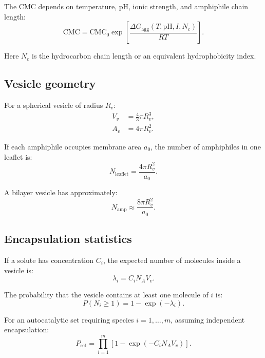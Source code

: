 \documentclass[11pt]{article}
\begin{document}
The CMC depends on temperature, pH, ionic strength, and amphiphile chain
length:
\begin{equation}
    \mathrm{CMC}
    =
    \mathrm{CMC}_0
    \exp\left[
    \frac{\Delta G_{\mathrm{agg}}(T,\mathrm{pH},I,N_c)}
    {RT}
    \right].
\end{equation}

Here $N_c$ is the hydrocarbon chain length or an equivalent hydrophobicity
index.

\subsection{Vesicle geometry}

For a spherical vesicle of radius $R_v$:
\begin{align}
    V_v &= \frac{4}{3}\pi R_v^3, \\
    A_v &= 4\pi R_v^2.
\end{align}

If each amphiphile occupies membrane area $a_0$, the number of amphiphiles in
one leaflet is:
\begin{equation}
    N_{\mathrm{leaflet}} =
    \frac{4\pi R_v^2}{a_0}.
\end{equation}

A bilayer vesicle has approximately:
\begin{equation}
    N_{\mathrm{amp}} \approx
    \frac{8\pi R_v^2}{a_0}.
\end{equation}

\subsection{Encapsulation statistics}

If a solute has concentration $C_i$, the expected number of molecules inside a
vesicle is:
\begin{equation}
    \lambda_i = C_i N_A V_v.
\end{equation}

The probability that the vesicle contains at least one molecule of $i$ is:
\begin{equation}
    P(N_i\geq 1) = 1-\exp(-\lambda_i).
\end{equation}

For an autocatalytic set requiring species $i=1,\ldots,m$, assuming independent
encapsulation:
\begin{equation}
    P_{\mathrm{set}}
    =
    \prod_{i=1}^{m}
    \left[1-\exp(-C_i N_A V_v)\right].
\end{equation}
\end{document}
